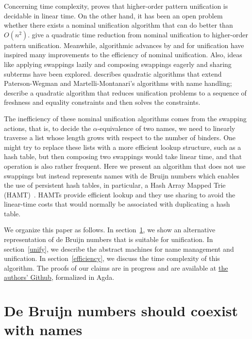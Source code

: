 \documentclass[a4paper,UKenglish]{lipics-v2016}
\begin{document}
Concerning time complexity, \citet{qian_unification_1996} proves that
higher-order pattern unification is decidable in linear time.  On the
other hand, it has been an open problem whether there exists a nominal
unification algorithm that can do better than
$O(n^2)$. \citet{levy_nominal_2012} give a quadratic time reduction
from nominal unification to higher-order pattern unification.
Meanwhile, algorithmic advances by \citet{paterson_linear_1978} and
\citet{martelli_efficient_1982} for unification have inspired many
improvements to the efficiency of nominal unification.  Also, ideas
like applying swappings lazily and composing swappings eagerly and
sharing subterms have been explored. \citet{calves_complexity_2010}
describes quadratic algorithms that extend Paterson-Wegman and
Martelli-Montanari's algorithms with name handling;
\citet{levy_efficient_2010} describe a quadratic algorithm that
reduces unification problems to a sequence of freshness and equality
constraints and then solves the constraints.

The inefficiency of these nominal unification algorithms comes from
the swapping actions, that is, to decide the $\alpha$-equivalence of
two names, we need to linearly traverse a list whose length grows with
respect to the number of binders.  One might try to replace these
lists with a more efficient lookup structure, such as a hash table,
but then composing two swappings would take linear time, and that
operation is also rather frequent.  Here we present an algorithm that
does not use swappings but instead represents names with de Bruijn
numbers which enables the use of persistent hash tables, in
particular, a Hash Array Mapped Trie
(HAMT)~\citep{bagwell_ideal_2001}. HAMTs provide efficient lookup and
they use sharing to avoid the linear-time costs that would normally be
associated with duplicating a hash table.

We organize this paper as follows.  In section~\ref{closures}, we show
an alternative representation of de Bruijn numbers that is suitable
for unification.  In section~\ref{unify}, we describe the abstract
machines for name management and unification.  In
section~\ref{efficiency}, we discuss the time complexity of this
algorithm. The proofs of our claims are in progress and are available
at \href{https://github.com/mvcccccc/UNIF2018}{the authors' Github},
formalized in Agda.
  

\section{De Bruijn numbers should coexist with names}
\label{closures}
\end{document}
